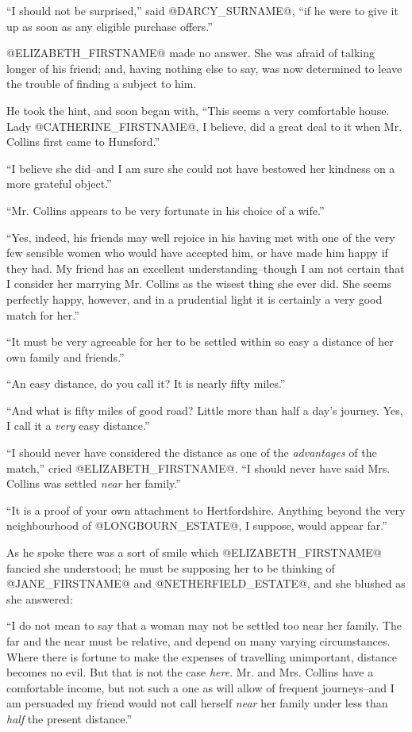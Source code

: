 ``I should not be surprised,'' said @DARCY_SURNAME@, ``if he were to give it up as
soon as any eligible purchase offers.''

@ELIZABETH_FIRSTNAME@ made no answer. She was afraid of talking longer of his
friend; and, having nothing else to say, was now determined to leave the
trouble of finding a subject to him.

He took the hint, and soon began with, ``This seems a very comfortable
house. Lady @CATHERINE_FIRSTNAME@, I believe, did a great deal to it when Mr.
Collins first came to Hunsford.''

``I believe she did--and I am sure she could not have bestowed her
kindness on a more grateful object.''

``Mr. Collins appears to be very fortunate in his choice of a wife.''

``Yes, indeed, his friends may well rejoice in his having met with one
of the very few sensible women who would have accepted him, or have made
him happy if they had. My friend has an excellent understanding--though
I am not certain that I consider her marrying Mr. Collins as the
wisest thing she ever did. She seems perfectly happy, however, and in a
prudential light it is certainly a very good match for her.''

``It must be very agreeable for her to be settled within so easy a
distance of her own family and friends.''

``An easy distance, do you call it? It is nearly fifty miles.''

``And what is fifty miles of good road? Little more than half a day's
journey. Yes, I call it a \textit{very} easy distance.''

``I should never have considered the distance as one of the \textit{advantages}
of the match,'' cried @ELIZABETH_FIRSTNAME@. ``I should never have said Mrs. Collins
was settled \textit{near} her family.''

``It is a proof of your own attachment to Hertfordshire. Anything beyond
the very neighbourhood of @LONGBOURN_ESTATE@, I suppose, would appear far.''

As he spoke there was a sort of smile which @ELIZABETH_FIRSTNAME@ fancied she
understood; he must be supposing her to be thinking of @JANE_FIRSTNAME@ and
@NETHERFIELD_ESTATE@, and she blushed as she answered:

``I do not mean to say that a woman may not be settled too near her
family. The far and the near must be relative, and depend on many
varying circumstances. Where there is fortune to make the expenses of
travelling unimportant, distance becomes no evil. But that is not the
case \textit{here}. Mr. and Mrs. Collins have a comfortable income, but not
such a one as will allow of frequent journeys--and I am persuaded my
friend would not call herself \textit{near} her family under less than \textit{half}
the present distance.''

